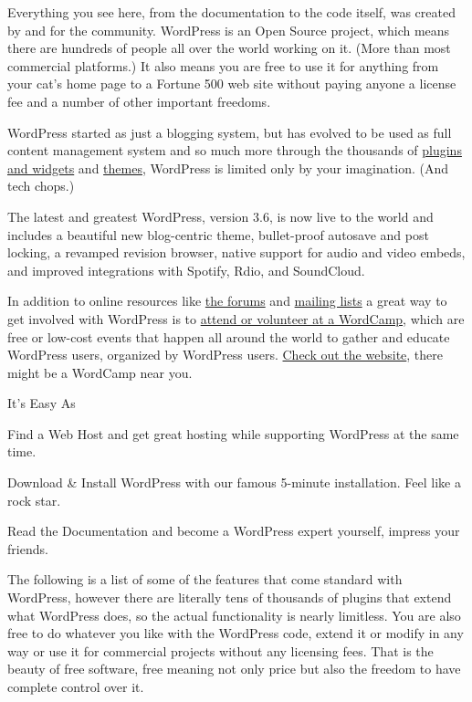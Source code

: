 Everything you see here, from the documentation to the code itself, was created by and for the community. WordPress is an Open Source project, which means there are hundreds of people all over the world working on it. (More than most commercial platforms.) It also means you are free to use it for anything from your cat's home page to a Fortune 500 web site without paying anyone a license fee and a number of other important freedoms.

WordPress started as just a blogging system, but has evolved to be used as full content management system and so much more through the thousands of \href{http://wordpress.org/plugins/}{plugins and widgets} and \href{http://wordpress.org/themes/}{themes}, WordPress is limited only by your imagination. (And tech chops.)



The latest and greatest WordPress, version 3.6, is now live to the world and includes a beautiful new blog-centric theme, bullet-proof autosave and post locking, a revamped revision browser, native support for audio and video embeds, and improved integrations with Spotify, Rdio, and SoundCloud. 

In addition to online resources like \href{http://wordpress.org/support/}{the forums} and \href{http://codex.wordpress.org/Mailing_Lists}{mailing lists} a great way to get involved with WordPress is to \href{http://wordcamp.org/}{attend or volunteer at a WordCamp}, which are free or low-cost events that happen all around the world to gather and educate WordPress users, organized by WordPress users. \href{http://wordcamp.org/}{Check out the website}, there might be a WordCamp near you.

{It's} Easy As
\begin{compactenum}
\item Find a Web Host and get great hosting while supporting WordPress at the same time.
\item Download \& Install WordPress with our famous 5-minute installation. Feel like a rock star.
\item Read the Documentation and become a WordPress expert yourself, impress your friends.
\end{compactenum}

The following is a list of some of the features that come standard with WordPress, however there are literally tens of thousands of plugins that extend what WordPress does, so the actual functionality is nearly limitless. You are also free to do whatever you like with the WordPress code, extend it or modify in any way or use it for commercial projects without any licensing fees. That is the beauty of free software, free meaning not only price but also the freedom to have complete control over it.


